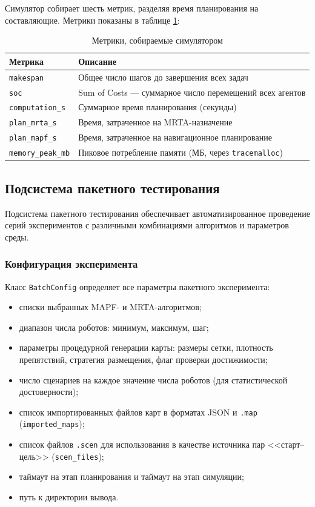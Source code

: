 Симулятор собирает шесть метрик, разделяя время планирования на составляющие. Метрики показаны в таблице \ref{tab:metrics}:

\begin{table}
    \caption{Метрики, собираемые симулятором}
    \begin{tabularx}{\textwidth}{|l|X|}\hline
    Метрика              & Описание \\ \hline
    \texttt{makespan}    & Общее число шагов до завершения всех задач \\ \hline
    \texttt{soc}         & Sum of Costs --- суммарное число перемещений всех агентов \\ \hline
    \texttt{computation\_s} & Суммарное время планирования (секунды) \\ \hline
    \texttt{plan\_mrta\_s}  & Время, затраченное на MRTA-назначение \\ \hline
    \texttt{plan\_mapf\_s}  & Время, затраченное на навигационное планирование \\ \hline
    \texttt{memory\_peak\_mb} & Пиковое потребление памяти (МБ, через \texttt{tracemalloc}) \\ \hline
    \end{tabularx}
    \label{tab:metrics}
\end{table}

\subsection{Подсистема пакетного тестирования}

Подсистема пакетного тестирования обеспечивает автоматизированное проведение серий экспериментов с различными комбинациями алгоритмов и параметров среды.

\subsubsection{Конфигурация эксперимента}

Класс \texttt{BatchConfig} определяет все параметры пакетного эксперимента:

\begin{itemize}
    \item списки выбранных MAPF- и MRTA-алгоритмов;
    \item диапазон числа роботов: минимум, максимум, шаг;
    \item параметры процедурной генерации карты: размеры сетки, плотность препятствий, стратегия размещения, флаг проверки достижимости;
    \item число сценариев на каждое значение числа роботов (для статистической достоверности);
    \item список импортированных файлов карт в форматах JSON и \texttt{.map} (\texttt{imported\_maps});
    \item список файлов \texttt{.scen} для использования в качестве источника пар <<старт--цель>> (\texttt{scen\_files});
    \item таймаут на этап планирования и таймаут на этап симуляции;
    \item путь к директории вывода.
\end{itemize}

